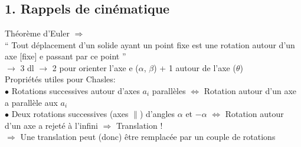 

\usepackage[usenames,dvipsnames]{xcolor}
\usepackage{graphicx}
\usepackage{url} 
\usepackage[toc]{appendix}
\usepackage{array}
\usepackage[final]{pdfpages}
\usepackage{listings}
\usepackage[Lenny]{fncychap}
\usepackage{verbatim}
\usepackage[top=1.5cm, bottom=1.5cm, left=1.5cm, right=1.5cm]{geometry}
\usepackage[rightcaption]{sidecap}
\usepackage{color}
\usepackage{here}
\usepackage{caption}
\usepackage{subcaption}
\providecommand{\e}[1]{\ensuremath{\times 10^{#1}}}
\usepackage{adjustbox}

\newenvironment{orangebox}{%
    \noindent
    \adjustbox{innerenv={varwidth}[c]{0.9\linewidth},margin=\fboxsep+.25cm \fboxsep+.2cm,bgcolor=lightorange,frame,center}\bgroup
}{%
    \egroup
}

\newenvironment{bluebox}{%
    \noindent
    \adjustbox{innerenv={varwidth}[c]{0.9\linewidth},margin=\fboxsep+.25cm \fboxsep+.2cm,bgcolor=lightsteel,frame,center}\bgroup
}{%
    \egroup
}

\usepackage{accents}
\makeatletter
\newcommand{\sbullet}{%
  \hbox{\fontfamily{lmr}\fontsize{.4\dimexpr(\f@size pt)}{0}\selectfont$\circ\circ$}}
\DeclareRobustCommand{\mecacc}{\accentset{\sbullet}}
\makeatother

\usepackage{tikz}


\boldmath
\section*{\centering {}}
\vspace{11pt}
\subsection*{1. Rappels de cinématique}
Théorème d'Euler $\Rightarrow$ \\
“ Tout déplacement d’un solide ayant {\color{orange}un point} fixe est une {\color{orange}rotation} autour d’{\color{orange}un axe} [fixe] e passant par ce point ”\\
$\rightarrow$ 3 dl $\rightarrow$ 2 pour orienter l’axe e ($\alpha$, $\beta$) + 1 autour de l’axe ($\theta$)\\

Propriétés utiles pour Chasles:\\
$\bullet$ Rotations successives autour d’axes $a_i$ parallèles $\Leftrightarrow$ Rotation autour d’un axe a parallèle aux $a_i$\\
$\bullet$ Deux rotations successives (axes $\parallel$) d’angles $\alpha$ et $-\alpha$  $\Leftrightarrow$ Rotation autour d’un axe a rejeté à l’infini $\Rightarrow$ Translation !\\
$\Rightarrow$ Une translation peut (donc) être remplacée par un couple de rotations\\

